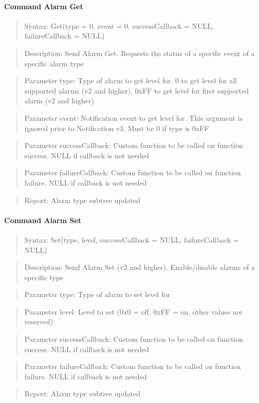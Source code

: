 \paragraph{Command Alarm Get}
\begin{quote}Syntax: Get(type = 0, event = 0, successCallback = NULL, failureCallback = NULL)\end{quote}
\begin{quote}Description: Send Alarm Get. Requests the status of a specific event of a specific alarm type\end{quote}
\begin{quote}Parameter type: Type of alarm to get level for. 0 to get level for all supported alarms (v2 and higher). 0xFF to get level for first supported alarm (v2 and higher)\end{quote}
\begin{quote}Parameter event: Notification event to get level for. This argument is ignored prior to Notification v3. Must be 0 if type is 0xFF\end{quote}
\begin{quote}Parameter successCallback: Custom function to be called on function success. NULL if callback is not needed\end{quote}
\begin{quote}Parameter failureCallback: Custom function to be called on function failure. NULL if callback is not needed\end{quote}
\begin{quote}Report: Alarm type subtree updated\end{quote}

\paragraph{Command Alarm Set}
\begin{quote}Syntax: Set(type, level, successCallback = NULL, failureCallback = NULL)\end{quote}
\begin{quote}Description: Send Alarm Set (v2 and higher). Enable/disable alarms of a specific type\end{quote}
\begin{quote}Parameter type: Type of alarm to set level for\end{quote}
\begin{quote}Parameter level: Level to set (0x0 = off, 0xFF = on, other values are reserved)\end{quote}
\begin{quote}Parameter successCallback: Custom function to be called on function success. NULL if callback is not needed\end{quote}
\begin{quote}Parameter failureCallback: Custom function to be called on function failure. NULL if callback is not needed\end{quote}
\begin{quote}Report: Alarm type subtree updated\end{quote}


